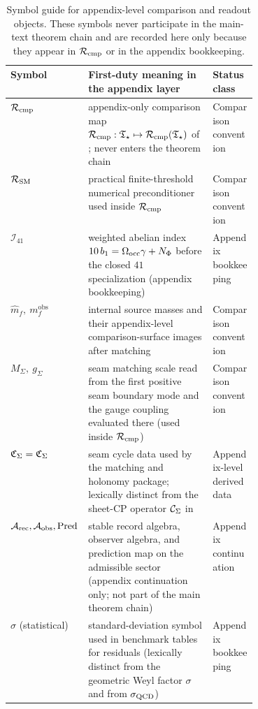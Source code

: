 \begin{table}[p]
\centering
\scriptsize
\setlength{\tabcolsep}{3pt}
\renewcommand{\arraystretch}{0.95}
\begin{tabularx}{\linewidth}{@{}>{\raggedright\arraybackslash}p{0.23\linewidth}Y>{\raggedright\arraybackslash}p{0.18\linewidth}@{}}
\toprule
Symbol & First-duty meaning in the appendix layer & Status class \\
\midrule
$\Rcmp$ & appendix-only comparison map $\mathcal R_{\mathrm{cmp}}:\mathfrak T_{\star}\mapsto\mathcal R_{\mathrm{cmp}}(\mathfrak T_{\star})$ of ; never enters the theorem chain & Comparison convention \\
$\mathcal R_{\mathrm{SM}}$ & practical finite-threshold numerical preconditioner used inside $\Rcmp$ & Comparison convention \\
$\mathcal I_{41}$ & weighted abelian index $10\,b_1=\Omega_{\mathrm{occ}}\gamma+N_\Phi$ before the closed $41$ specialization (appendix bookkeeping) & Appendix bookkeeping \\
$\hat m_f,\ m_f^{\mathrm{obs}}$ & internal source masses and their appendix-level comparison-surface images after matching & Comparison convention \\
$M_\Sigma,\ g_\Sigma$ & seam matching scale read from the first positive seam boundary mode and the gauge coupling evaluated there (used inside $\Rcmp$) & Comparison convention \\
$\mathfrak C_{\Sigma}=\mathfrak C_\Sigma$ & seam cycle data used by the matching and holonomy package; lexically distinct from the sheet-CP operator $\mathcal C_{\Sigma}$ in  & Appendix-level derived data \\
$\mathcal A_{\mathrm{rec}},\mathcal A_{\mathrm{obs}},\operatorname{Pred}$ & stable record algebra, observer algebra, and prediction map on the admissible sector (appendix continuation only; not part of the main theorem chain) & Appendix continuation \\
$\sigma$ (statistical) & standard-deviation symbol used in benchmark tables for residuals (lexically distinct from the geometric Weyl factor $\sigma$ and from $\sigma_{\mathrm{QCD}}$) & Appendix bookkeeping \\
\bottomrule
\end{tabularx}
\caption{Symbol guide for appendix-level comparison and readout objects. These symbols never
participate in the main-text theorem chain  and are
recorded here only because they appear in $\Rcmp$ or in the appendix bookkeeping.}
\label{tab:symbol-guide-appendix}
\end{table}

